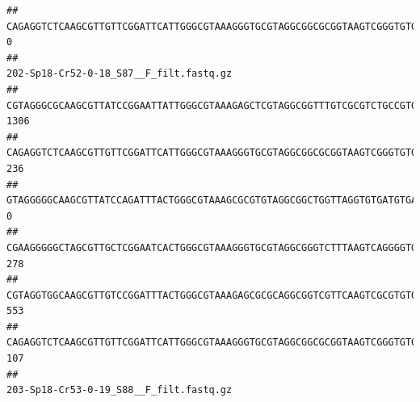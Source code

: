 \documentclass[]{article}
\begin{document}
\begin{verbatim}
## CAGAGGTCTCAAGCGTTGTTCGGATTCATTGGGCGTAAAGGGTGCGTAGGCGGCGCGGTAAGTCGGGTGTGAAATCTCGGGGCTTAACTCCGAAACTGCATTCGATACTGCCGTGCTTGAGGACTGGAGAGGAGACTGGAATTTACGGTGTAGCGGTGAAATGCGTAGATATCGTAAGGAAGACCAGTGGCGAAGGCGGGTCTCTGGACAGTTCCTGACGCTGAGGCACGAAGGCCAGGGGAGCAAACG                                       0
##                                                                                                                                                                                                                                                           202-Sp18-Cr52-0-18_S87__F_filt.fastq.gz
## CGTAGGGCGCAAGCGTTATCCGGAATTATTGGGCGTAAAGAGCTCGTAGGCGGTTTGTCGCGTCTGCCGTGAAAGTCCGGGGCTCAACTCCGGATCTGCGGTGGGTACGGGCAGACTAGAGTGATGTAGGGGAGACTGGAATTCCTGGTGTAGCGGTGAAATGCGCAGATATCAGGAGGAACACCGATGGCGAAGGCAGGTCTCTGGGCATTAACTGACGCTGAGGAGCGAAAGCATGGGGAGCGAACA                                    1306
## CAGAGGTCTCAAGCGTTGTTCGGATTCATTGGGCGTAAAGGGTGCGTAGGCGGCGCGGTAAGTCGGGTGTGAAATCTCGGAGCTTAACTCCGAAACTGCATTCGATACTGCCGTGCTTGAGGACTGGAGAGGAGACTGGAATTTACGGTGTAGCGGTGAAATGCGTAGATATCGTAAGGAAGACCAGTGGCGAAGGCGGGTCTCTGGACAGTTCCTGACGCTGAGGCACGAAGGCCAGGGGAGCAAACG                                     236
## GTAGGGGGCAAGCGTTATCCAGATTTACTGGGCGTAAAGCGCGTGTAGGCGGCTGGTTAGGTGTGATGTGAAATCTTCCGGCTCAACCGGAAAACTGCATTGCAAACCGGCCTGGCTAGAGTGCAGGAGAGGGAAGCGGAATTCCAGGTGTAGCGGTGAAATGCGTAGATATCTGGAGGAACACCAGTGGCGAAGGCGGCTTCCTGGCCTGCAACTGACGCTGAGACGCGAAAGCGTGGGGAGCGAAC                                        0
## CGAAGGGGGCTAGCGTTGCTCGGAATCACTGGGCGTAAAGGGTGCGTAGGCGGGTCTTTAAGTCAGGGGTGAAATCCTGGAGCTCAACTCCAGAACTGCCTTTGATACTGAAGATCTTGAGTTCGGGAGAGGTGAGTGGAACTGCGAGTGTAGAGGTGAAATTCGTAGATATTCGCAAGAACACCAGTGGCGAAGGCGGCTCACTGGCCCGATACTGACGCTGAGGCACGAAAGCGTGGGGAGCAAACA                                     278
## CGTAGGTGGCAAGCGTTGTCCGGATTTACTGGGCGTAAAGAGCGCGCAGGCGGTCGTTCAAGTCGCGTGTGAAAGCCCCCGGCTCAACTGGGGAGGGTCACGCGATACTGATCGACTCGAAGGCAGGAGAGGGTAGTGGAATTCCCGGTGTAGTGGTGAAATGCGTAGATATCGGGAGGAACACCAGTGGCGAAGGCGACTACCTGGCCTGTTCTTGACGCTGAGGCGCGAAAGCTAGGGGAGCAAACG                                     553
## CAGAGGTCTCAAGCGTTGTTCGGATTCATTGGGCGTAAAGGGTGCGTAGGCGGCGCGGTAAGTCGGGTGTGAAATCTCGGGGCTTAACTCCGAAACTGCATTCGATACTGCCGTGCTTGAGGACTGGAGAGGAGACTGGAATTTACGGTGTAGCGGTGAAATGCGTAGATATCGTAAGGAAGACCAGTGGCGAAGGCGGGTCTCTGGACAGTTCCTGACGCTGAGGCACGAAGGCCAGGGGAGCAAACG                                     107
##                                                                                                                                                                                                                                                           203-Sp18-Cr53-0-19_S88__F_filt.fastq.gz

\end{verbatim}
\end{document}
